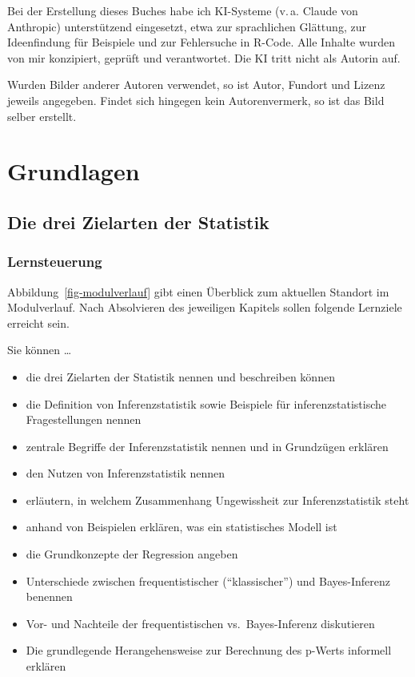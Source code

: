 \documentclass[
  ngerman,
  letterpaper,
  twoside,
  open=any]{scrbook}
\providecommand{\tightlist}{%
  \setlength{\itemsep}{0pt}\setlength{\parskip}{0pt}}\usepackage{longtable,booktabs,array}
\theoremstyle{definition}
\theoremstyle{plain}
\theoremstyle{definition}
\theoremstyle{definition}
\theoremstyle{definition}
\theoremstyle{definition}
\theoremstyle{remark}
\begin{document}
Bei der Erstellung dieses Buches habe ich KI-Systeme (v.\,a. Claude von
Anthropic) unterstützend eingesetzt, etwa zur sprachlichen Glättung, zur
Ideenfindung für Beispiele und zur Fehlersuche in R-Code. Alle Inhalte
wurden von mir konzipiert, geprüft und verantwortet. Die KI tritt nicht
als Autorin auf.

Wurden Bilder anderer Autoren verwendet, so ist Autor, Fundort und
Lizenz jeweils angegeben. Findet sich hingegen kein Autorenvermerk, so
ist das Bild selber erstellt.

\part{Grundlagen}

\chapter{Die drei Zielarten der
Statistik}\label{die-drei-zielarten-der-statistik}

\section{Lernsteuerung}\label{lernsteuerung}

Abbildung~\ref{fig-modulverlauf} gibt einen Überblick zum aktuellen
Standort im Modulverlauf. Nach Absolvieren des jeweiligen Kapitels
sollen folgende Lernziele erreicht sein.

Sie können \ldots{}

\begin{itemize}
\tightlist
\item
  die drei Zielarten der Statistik nennen und beschreiben können
\item
  die Definition von Inferenzstatistik sowie Beispiele für
  inferenzstatistische Fragestellungen nennen
\item
  zentrale Begriffe der Inferenzstatistik nennen und in Grundzügen
  erklären
\item
  den Nutzen von Inferenzstatistik nennen
\item
  erläutern, in welchem Zusammenhang Ungewissheit zur Inferenzstatistik
  steht
\item
  anhand von Beispielen erklären, was ein statistisches Modell ist
\item
  die Grundkonzepte der Regression angeben
\item
  Unterschiede zwischen frequentistischer (\enquote{klassischer}) und
  Bayes-Inferenz benennen
\item
  Vor- und Nachteile der frequentistischen vs.~Bayes-Inferenz
  diskutieren
\item
  Die grundlegende Herangehensweise zur Berechnung des p-Werts informell
  erklären
\end{itemize}
\end{document}
